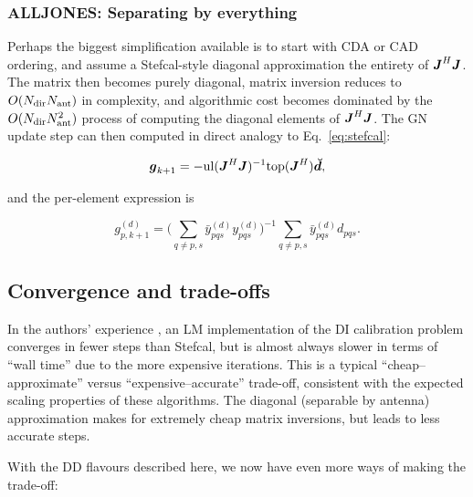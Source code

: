 \documentclass[useAMS,usenatbib]{mn2e}
\newcommand{\mat}[1]{{\bmath{#1}}}
\newcommand{\JJ}{\mat{J}} %
\newcommand{\JHJ}{\JJ^H\JJ} %
\begin{document}
\subsubsection{ALLJONES: Separating by everything}

Perhaps the biggest simplification available is to start with CDA or CAD ordering, and assume a Stefcal-style diagonal 
approximation the entirety of $\JHJ$. The matrix then becomes purely diagonal, matrix inversion reduces to $O(N_\mathrm{dir}N_\mathrm{ant})$ in 
complexity, and algorithmic cost becomes dominated by the $O(N_\mathrm{dir}N_\mathrm{ant}^2)$ process of computing the diagonal elements of 
$\JHJ$. The GN update step can then computed in direct analogy to Eq.~\ref{eq:stefcal}:

\[
\bmath{g}_{k+1} = -\UL(\JHJ)^{-1} \TOP(\JJ^H) \Dd,
\]

and the per-element expression is 

\begin{equation}
\label{eq:stefcal:dd:unpol}
g_{p,k+1}^{(d)} = 
\big( \sum\limits_{q\ne p,s} \bar{y}^{(d)}_{pqs} y^{(d)}_{pqs} \big)^{-1}
\sum\limits_{q\ne p,s} \bar{y}^{(d)}_{pqs} d_{pqs}.
\end{equation}

\subsection{Convergence and trade-offs}

In the authors' experience \citep{OMS-Stefcal}, an LM implementation of the DI calibration problem converges in fewer steps 
than Stefcal, but is almost always slower in terms of ``wall time'' due to the more expensive iterations. This is a 
typical ``cheap--approximate'' versus ``expensive--accurate'' trade-off, consistent with the expected scaling properties 
of these algorithms. The diagonal (separable by antenna) approximation makes for extremely cheap matrix inversions,
but leads to less accurate steps.

With the DD flavours described here, we now have even more ways of making the trade-off:
\end{document}
